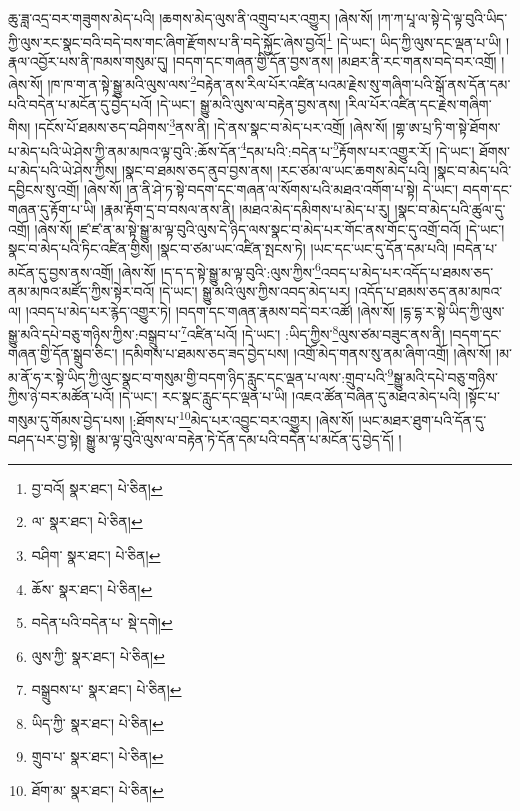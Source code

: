 ཆུ་ཟླ་འདྲ་བར་གཟུགས་མེད་པའི། །ཆགས་མེད་ལུས་ནི་འགྲུབ་པར་འགྱུར། །ཞེས་སོ། །ཀ་ཀ་པཱ་ལ་སྟེ་དེ་ལྟ་བུའི་ཡིད་ཀྱི་ལུས་རང་སྣང་བའི་བདེ་བས་གང་ཞིག་རྫོགས་པ་ནི་བདེ་སྐྱོང་ཞེས་བྱའོ།\footnote{བྱ་བའོ།  སྣར་ཐང་།  པེ་ཅིན། } །དེ་ཡང་། ཡིད་ཀྱི་ལུས་དང་ལྡན་པ་ཡི། །རྣལ་འབྱོར་པས་ནི་ཁམས་གསུམ་དུ། །བདག་དང་གཞན་གྱི་དོན་བྱས་ནས། །མཐར་ནི་རང་གནས་བདེ་བར་འགྲོ། །ཞེས་སོ། །ཁ་ཁ་ག་ན་སྟེ་སྒྱུ་མའི་ལུས་ལས་\footnote{ལ་  སྣར་ཐང་།  པེ་ཅིན། }བརྟེན་ནས་རིལ་པོར་འཛིན་པའམ་རྗེས་སུ་གཞིག་པའི་སྒོ་ནས་དོན་དམ་པའི་བདེན་པ་མངོན་དུ་བྱེད་པའོ། །དེ་ཡང་། སྒྱུ་མའི་ལུས་ལ་བརྟེན་བྱས་ནས། །རིལ་པོར་འཛིན་དང་རྗེས་གཞིག་གིས། །དངོས་པོ་ཐམས་ཅད་བཤིགས་\footnote{བཤིག་  སྣར་ཐང་།  པེ་ཅིན། }ནས་ནི། །དེ་ནས་སྣང་བ་མེད་པར་འགྲོ། །ཞེས་སོ། །གྷ་ཨ་པྲ་ཏི་ག་སྟེ་ཐོགས་པ་མེད་པའི་ཡེ་ཤེས་ཀྱི་ནམ་མཁའ་ལྟ་བུའི་:ཆོས་དོན་\footnote{ཆོས་  སྣར་ཐང་།  པེ་ཅིན། }དམ་པའི་:བདེན་པ་\footnote{བདེན་པའི་བདེན་པ་  སྡེ་དགེ། }རྟོགས་པར་འགྱུར་རོ། །དེ་ཡང་། ཐོགས་པ་མེད་པའི་ཡེ་ཤེས་ཀྱིས། །སྣང་བ་ཐམས་ཅད་ནུབ་བྱས་ནས། །རང་ཙམ་ལ་ཡང་ཆགས་མེད་པའི། །སྣང་བ་མེད་པའི་དབྱིངས་སུ་འགྲོ། །ཞེས་སོ། །ན་ནི་ཤེ་ཏ་སྟེ་བདག་དང་གཞན་ལ་སོགས་པའི་མཐའ་འགོག་པ་སྟེ། དེ་ཡང་། བདག་དང་གཞན་དུ་རྟོག་པ་ཡི། །རྣམ་རྟོག་དྲ་བ་བསལ་ནས་ནི། །མཐའ་མེད་དམིགས་པ་མེད་པ་རུ། །སྣང་བ་མེད་པའི་ཚུལ་དུ་འགྲོ། །ཞེས་སོ། །ཛ་ཛ་ན་མ་སྟེ་སྒྱུ་མ་ལྟ་བུའི་ལུས་དེ་ཉིད་ལས་སྣང་བ་མེད་པར་གོང་ནས་གོང་དུ་འགྲོ་བའོ། །དེ་ཡང་། སྣང་བ་མེད་པའི་ཏིང་འཛིན་གྱིས། །སྣང་བ་ཙམ་ཡང་འཛིན་སྤངས་ཏེ། །ཡང་དང་ཡང་དུ་དོན་དམ་པའི། །བདེན་པ་མངོན་དུ་བྱས་ནས་འགྲོ། །ཞེས་སོ། །ད་ད་ད་སྟེ་སྒྱུ་མ་ལྟ་བུའི་:ལུས་ཀྱིས་\footnote{ལུས་ཀྱི་  སྣར་ཐང་།  པེ་ཅིན། }འབད་པ་མེད་པར་འདོད་པ་ཐམས་ཅད་ནམ་མཁའ་མཛོད་ཀྱིས་སྟེར་བའོ། །དེ་ཡང་། སྒྱུ་མའི་ལུས་ཀྱིས་འབད་མེད་པར། །འདོད་པ་ཐམས་ཅད་ནམ་མཁའ་ལ། །འབད་པ་མེད་པར་རྙེད་འགྱུར་ཏེ། །བདག་དང་གཞན་རྣམས་བདེ་བར་འཚོ། །ཞེས་སོ། །དྷ་དྷ་ར་སྟེ་ཡིད་ཀྱི་ལུས་སྒྱུ་མའི་དཔེ་བཅུ་གཉིས་ཀྱིས་:བསྒྲུབ་པ་\footnote{བསྒྲུབས་པ་  སྣར་ཐང་།  པེ་ཅིན། }འཛིན་པའོ། །དེ་ཡང་། :ཡིད་ཀྱིས་\footnote{ཡིད་ཀྱི་  སྣར་ཐང་།  པེ་ཅིན། }ལུས་ཙམ་བཟུང་ནས་ནི། །བདག་དང་གཞན་གྱི་དོན་སྒྲུབ་ཅིང་། །དམིགས་པ་ཐམས་ཅད་ཟད་བྱེད་པས། །འགྲོ་མེད་གནས་སུ་ནམ་ཞིག་འགྲོ། །ཞེས་སོ། །མ་མ་ནོ་ཧ་ར་སྟེ་ཡིད་ཀྱི་ལུང་སྣང་བ་གསུམ་གྱི་བདག་ཉིད་རླུང་དང་ལྡན་པ་ལས་:གྲུབ་པའི་\footnote{གྲུབ་པ་  སྣར་ཐང་།  པེ་ཅིན། }སྒྱུ་མའི་དཔེ་བཅུ་གཉིས་ཀྱིས་ཉེ་བར་མཚོན་པའོ། །དེ་ཡང་། རང་སྣང་རླུང་དང་ལྡན་པ་ཡི། །འཇའ་ཚོན་བཞིན་དུ་མཐའ་མེད་པའི། །སྟོང་པ་གསུམ་དུ་གོམས་བྱེད་པས། །:ཐོགས་པ་\footnote{ཐོག་མ་  སྣར་ཐང་།  པེ་ཅིན། }མེད་པར་འབྱུང་བར་འགྱུར། །ཞེས་སོ། །ཡང་མཐར་ཐུག་པའི་དོན་དུ་བཤད་པར་བྱ་སྟེ། སྒྱུ་མ་ལྟ་བུའི་ལུས་ལ་བརྟེན་ཏེ་དོན་དམ་པའི་བདེན་པ་མངོན་དུ་བྱེད་དོ། །
